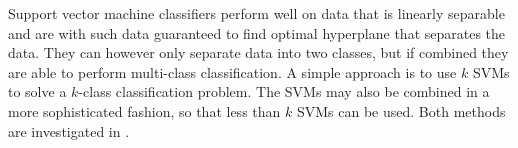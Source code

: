 Support vector machine classifiers perform well on data that is linearly separable and are with such data guaranteed to find optimal hyperplane that separates the data. They can however only separate data into two classes, but if combined they are able to perform multi-class classification. A simple approach is to use $k$ SVMs to solve a $k$-class classification problem. The SVMs may also be combined in a more sophisticated fashion, so that less than $k$ SVMs can be used. Both methods are investigated in \cite{Mayoras99SVM}.